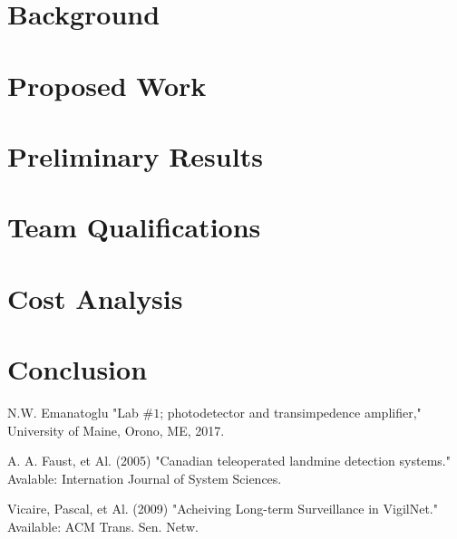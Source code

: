 \documentclass{article}
\begin{document}
 
  \section{Background}
    
  
   \section{Proposed Work}
   	 
 	
    
  \section{Preliminary Results}
  	

    
  \section{Team Qualifications}
     
    
    
    
   \section{Cost Analysis}
   	
   	
    \section{Conclusion}
        

    
    \newpage
\clearpage

\appendix

\begin{thebibliography}{00}



 N.W. Emanatoglu "Lab $\#1$; photodetector and transimpedence amplifier," University of Maine, Orono, ME, 2017.
\newline

 A. A. Faust, et Al. (2005) "Canadian teleoperated landmine detection systems." Avalable: Internation Journal of System Sciences.
\newline

 Vicaire, Pascal, et Al. (2009) "Acheiving Long-term Surveillance in VigilNet." Available: ACM Trans. Sen. Netw.
\newline

\newpage


\end{thebibliography}
\end{document}
